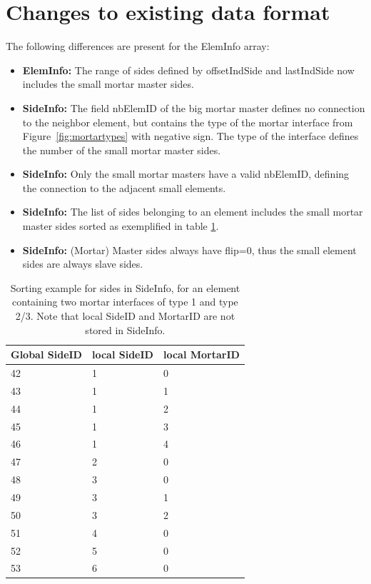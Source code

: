\documentclass[a4paper,headsepline]{scrreprt}
\begin{document}
\section{Changes to existing data format}

The following differences are present for the ElemInfo array:
\begin{itemize}
\item {\bf ElemInfo:} The range of sides defined by offsetIndSide and lastIndSide now includes the small mortar master sides.
\item {\bf SideInfo:} The field nbElemID of the big mortar master defines no connection to the neighbor element, but contains the type of the mortar interface from Figure~\ref{fig:mortartypes} with negative sign. The type of the interface defines the number of the small mortar master sides.
\item {\bf SideInfo:} Only the small mortar masters have a valid nbElemID, defining the connection to the adjacent small elements.
\item {\bf SideInfo:} The list of sides belonging to an element includes the small mortar master sides sorted as exemplified in table \ref{tab:mortarsorting}.
\item {\bf SideInfo:} (Mortar) Master sides always have flip=0, thus the small element sides are always slave sides.

\end{itemize}

\begin{table}[h!]
\label{tab:mortarsorting}
\centering
\begin{tabular}{|l|l|l|} \hline
  Global SideID & local SideID & local MortarID  \\ \hline
   42 & 1 & 0  \\ 
   43 & 1 & 1  \\ 
   44 & 1 & 2  \\ 
   45 & 1 & 3  \\ 
   46 & 1 & 4  \\ \hline
   47 & 2 & 0  \\ \hline
   48 & 3 & 0  \\ 
   49 & 3 & 1  \\ 
   50 & 3 & 2  \\ \hline
   51 & 4 & 0  \\ \hline
   52 & 5 & 0  \\ \hline
   53 & 6 & 0  \\ \hline
\end{tabular}
\caption{Sorting example for sides in SideInfo, for an element containing two mortar interfaces of type 1 and type 2/3. Note that local SideID and MortarID are not stored in SideInfo.}
\end{table}
\end{document}
